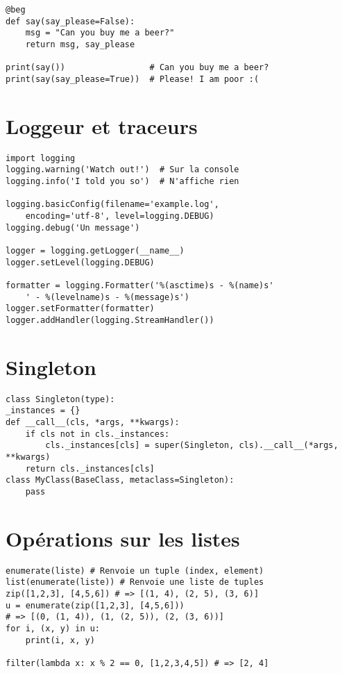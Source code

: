 \documentclass[9pt]{extarticle}
\begin{document}
\begin{multicols*}{4}
\begin{lstlisting}
@beg
def say(say_please=False):
    msg = "Can you buy me a beer?"
    return msg, say_please

print(say())                 # Can you buy me a beer?
print(say(say_please=True))  # Please! I am poor :(
\end{lstlisting}

\section*{Loggeur et traceurs}
\begin{lstlisting}
import logging
logging.warning('Watch out!')  # Sur la console
logging.info('I told you so')  # N'affiche rien

logging.basicConfig(filename='example.log',
    encoding='utf-8', level=logging.DEBUG)
logging.debug('Un message')

logger = logging.getLogger(__name__)
logger.setLevel(logging.DEBUG)

formatter = logging.Formatter('%(asctime)s - %(name)s'
    ' - %(levelname)s - %(message)s')
logger.setFormatter(formatter)
logger.addHandler(logging.StreamHandler())

\end{lstlisting}

\section*{Singleton}
\begin{lstlisting}
class Singleton(type):
_instances = {}
def __call__(cls, *args, **kwargs):
    if cls not in cls._instances:
        cls._instances[cls] = super(Singleton, cls).__call__(*args, **kwargs)
    return cls._instances[cls]
class MyClass(BaseClass, metaclass=Singleton):
    pass
\end{lstlisting}

\section*{Opérations sur les listes}
\begin{lstlisting}
enumerate(liste) # Renvoie un tuple (index, element)
list(enumerate(liste)) # Renvoie une liste de tuples
zip([1,2,3], [4,5,6]) # => [(1, 4), (2, 5), (3, 6)]
u = enumerate(zip([1,2,3], [4,5,6]))
# => [(0, (1, 4)), (1, (2, 5)), (2, (3, 6))]
for i, (x, y) in u:
    print(i, x, y)

filter(lambda x: x % 2 == 0, [1,2,3,4,5]) # => [2, 4]
\end{lstlisting}


\end{multicols*}
\end{document}

